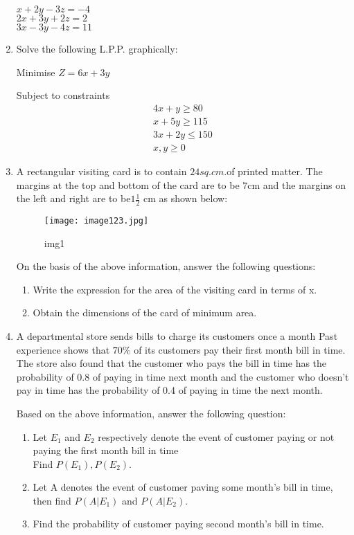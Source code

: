 \documentclass{article}
\begin{document}
\begin{enumerate}
$x +2y-3z=-4$\\
$2x+3y+2z=2$\\
$3x-3y-4z=11$

\item Solve the following L.P.P. graphically:

Minimise $Z = 6x + 3y$

Subject to constraints
\begin{align*}
 4x+y\geq80\\
 x+5y\geq115\\
 3x+2y\leq150\\
x,y\geq0
\end{align*}
\item A rectangular visiting card is to contain $24 sq.cm. $of printed matter. The margins at the top and bottom of the card are to be $7\mathrm{cm}$ and the margins on the left and right are to be$1\frac{1}{2}$ cm as shown below:

\begin{figure}[h!]
\centering
\texttt{[image: image123.jpg]}
\caption{img1}
\label{fig:image123}
\end{figure}

On the basis of the above information, answer the following questions:
\begin{enumerate}
\item Write the expression for the area of the visiting card in terms of x.
\item Obtain the dimensions of the card of minimum area.
\end{enumerate}
\item A departmental store sends bills to charge its customers once a month Past experience shows that $ 70\% $ of its customers pay their first month bill in time. The store also found that the customer who pays the bill in time has the probability of 0.8 of paying in time next month and the customer who doesn't pay in time has the probability of 0.4 of paying in time the next month.

Based on the above information, answer the following question:
\begin{enumerate}
\item Let  $E_1$ and $E_2$ respectively denote the event of customer paying or not paying the first month bill in time\\
Find $P(E_1),P(E_2).$
\item Let A denotes the event of customer paving some month's bill in time, then find $P(A|E_1)$ and $P(A|E_2).$
\item Find the probability of customer paying second month's bill in time.
\end{enumerate}


\end{enumerate}
\end{document}
